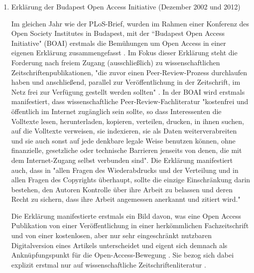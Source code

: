 \begin{enumerate}

\item Erklärung der Budapest Open Access Initiative (Dezember 2002 und 2012)

Im gleichen Jahr wie der PLoS-Brief, wurden im Rahmen einer Konferenz des Open Society Institutes in Budapest, mit der “Budapest Open Access Initiative" (BOAI)\cite{boai_2002} erstmals die Bemühungen um Open Access in einer eigenen Erklärung zusammengefasst \cite{yiotis_2013_open} \cite{garcia_2010_open} \cite{cite:21a}. Im Fokus dieser Erklärung steht die Forderung nach freiem Zugang (ausschließlich) zu wissenschaftlichen Zeitschriftenpublikationen, "die zuvor einen Peer-Review-Prozess durchlaufen haben und anschließend, parallel zur Veröffentlichung in der Zeitschrift, im Netz frei zur Verfügung gestellt werden sollten" \cite{Schirmbacher_oa_2007}. In der BOAI wird erstmals manifestiert, dass wissenschaftliche Peer-Review-Fachliteratur "kostenfrei und öffentlich im Internet zugänglich sein sollte, so dass Interessenten die Volltexte lesen, herunterladen, kopieren, verteilen, drucken, in ihnen suchen, auf die Volltexte verweisen, sie indexieren, sie als Daten weiterverabreiten und sie auch sonst auf jede denkbare legale Weise benutzen können, ohne finanzielle, gesetzliche oder technische Barrieren jenseits von denen, die mit dem Internet-Zugang selbst verbunden sind". \cite{boai_2002} Die Erklärung manifestiert auch, dass in "allen Fragen des Wiederabdrucks und der Verteilung und in allen Fragen des Copyrights überhaupt, sollte die einzige Einschränkung darin bestehen, den Autoren Kontrolle über ihre Arbeit zu belassen und deren Recht zu sichern, dass ihre Arbeit angemessen anerkannt und zitiert wird." \cite{boai_2002}

Die Erklärung manifestierte erstmals ein Bild davon, was eine Open Access Publikation von einer Veröffentlichung in einer herkömmlichen Fachzeitschrift und von einer kostenlosen, aber nur sehr eingeschränkt nutzbaren Digitalversion eines Artikels unterscheidet und eigent sich demnach als Anknüpfungspunkt für die Open-Access-Bewegung \cite{naeder_2010_open}. Sie bezog sich dabei explizit erstmal nur auf wissenschaftliche Zeitschriftenliteratur \cite{boai_2002}.


\end{enumerate}
